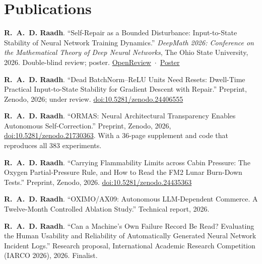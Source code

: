 \documentclass[10pt,a4paper]{article}
\begin{document}
\section*{Publications}
\begin{pubs}
  \item \textbf{R.~A.~D. Raadh}. ``Self-Repair as a Bounded Disturbance: Input-to-State Stability of Neural Network Training Dynamics.'' \textit{DeepMath 2026: Conference on the Mathematical Theory of Deep Neural Networks}, The Ohio State University, 2026. Double-blind review; poster. \mbox{\href{https://openreview.net/forum?id=kowltBZEIv}{OpenReview} $\cdot$ \href{https://www.raadh.me/deepmath}{Poster}}
\end{pubs}
\begin{pubs}[resume]
  \item \textbf{R.~A.~D. Raadh}. ``Dead BatchNorm--ReLU Units Need Resets: Dwell-Time Practical Input-to-State Stability for Gradient Descent with Repair.'' Preprint, Zenodo, 2026; under review. \mbox{\href{https://doi.org/10.5281/zenodo.24406555}{doi:10.5281/zenodo.24406555}}
  \item \textbf{R.~A.~D. Raadh}. ``ORMAS: Neural Architectural Transparency Enables Autonomous Self-Correction.'' Preprint, Zenodo, 2026, \href{https://doi.org/10.5281/zenodo.21730363}{doi:10.5281/zenodo.21730363}. With a 36-page supplement and code that reproduces all 383 experiments.
  \item \textbf{R.~A.~D. Raadh}. ``Carrying Flammability Limits across Cabin Pressure: The Oxygen Partial-Pressure Rule, and How to Read the FM2 Lunar Burn-Down Tests.'' Preprint, Zenodo, 2026. \mbox{\href{https://doi.org/10.5281/zenodo.24435363}{doi:10.5281/zenodo.24435363}}
  \item \textbf{R.~A.~D. Raadh}. ``OXIMO/AX09: Autonomous LLM-Dependent Commerce. A Twelve-Month Controlled Ablation Study.'' Technical report, 2026.
\end{pubs}
\begin{pubs}[resume]
  \item \textbf{R.~A.~D. Raadh}. ``Can a Machine's Own Failure Record Be Read? Evaluating the Human Usability and Reliability of Automatically Generated Neural Network Incident Logs.'' Research proposal, International Academic Research Competition (IARCO 2026), 2026. Finalist.
\end{pubs}
\end{document}
